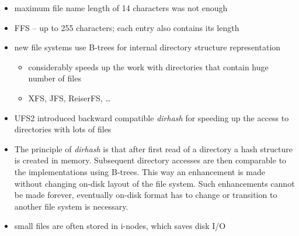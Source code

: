 \begin{slide}
\begin{itemize}
\item maximum file name length of 14 characters was not enough
\item FFS -- up to 255 characters; each entry also contains its length
\item new file systems use B-trees for internal directory structure
representation
    \begin{itemize}
    \item considerably speeds up the work with directories that contain huge
    number of files
    \item XFS, JFS, ReiserFS, \dots
    \end{itemize}
\item UFS2 introduced backward compatible \emph{dirhash} for speeding up
the access to directories with lots of files
\end{itemize}
\end{slide}

\begin{itemize}
\item The principle of \emph{dirhash} is that after first read of a directory a
hash structure is created in memory. Subsequent directory accesses are then
comparable to the implementations using B-trees. This way an enhancement is made
without changing on-disk layout of the file system. Such enhancements cannot be
made forever, eventually on-disk format has to change or transition to another
file system is necessary.
\item small files are often stored in i-nodes, which saves disk I/O
\end{itemize}



\begin{slide}
\begin{center}

\end{center}
\end{slide}

